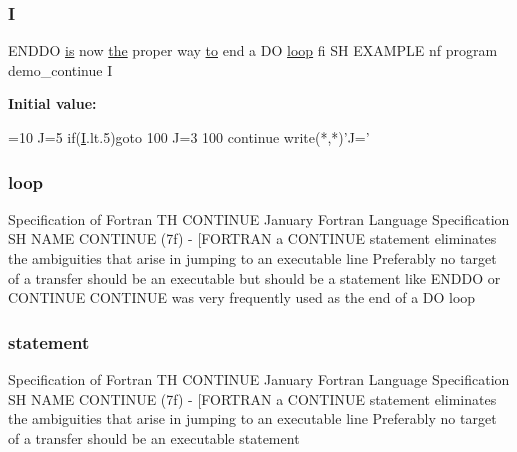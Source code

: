 \subsubsection{\texorpdfstring{I}{I}}
{\footnotesize\ttfamily E\+N\+D\+DO \hyperlink{intro__blas1_83_8txt_a42a91df93f840595de3019ceb5d1df23}{is} now \hyperlink{M__stopwatch_83_8txt_a0f266597de2e57eb3aa964927bb30e14}{the} proper way \hyperlink{M__stopwatch_83_8txt_a97209fd3e34ef701c0a9734280779cbb}{to} end a DO \hyperlink{continue_87_8txt_a5094e6a64d1227c84a0bf4db8f6c3788}{loop} fi SH E\+X\+A\+M\+P\+LE nf program demo\+\_\+continue I}

{\bfseries Initial value\+:}
\begin{DoxyCode}
=10
         J=5
         \textcolor{keywordflow}{if}(\hyperlink{continue_87_8txt_ae7b8826453d28f1bdb2fba7e889eb23b}{I}.lt.5)\textcolor{keywordflow}{goto} 100
         J=3
   100   \textcolor{keywordflow}{continue}
         write(*,*)\textcolor{stringliteral}{'J='}
\end{DoxyCode}
\mbox{\label{continue_87_8txt_a5094e6a64d1227c84a0bf4db8f6c3788}} 
\subsubsection{\texorpdfstring{loop}{loop}}
{\footnotesize\ttfamily Specification of Fortran TH C\+O\+N\+T\+I\+N\+UE January Fortran Language Specification SH N\+A\+ME C\+O\+N\+T\+I\+N\+UE (7f) -\/ \mbox{[}\+F\+O\+R\+T\+R\+A\+N a C\+O\+N\+T\+I\+N\+U\+E statement eliminates the ambiguities that arise in jumping to an executable line Preferably no target of a transfer should be an executable but should be a statement like E\+N\+D\+D\+O or C\+O\+N\+T\+I\+N\+U\+E C\+O\+N\+T\+I\+N\+U\+E was very frequently used as the end of a D\+O loop}

\mbox{\label{continue_87_8txt_ab499dad98bb4e44fe84dabd1bf0fa987}} 
\subsubsection{\texorpdfstring{statement}{statement}}
{\footnotesize\ttfamily Specification of Fortran TH C\+O\+N\+T\+I\+N\+UE January Fortran Language Specification SH N\+A\+ME C\+O\+N\+T\+I\+N\+UE (7f) -\/ \mbox{[}\+F\+O\+R\+T\+R\+A\+N a C\+O\+N\+T\+I\+N\+U\+E statement eliminates the ambiguities that arise in jumping to an executable line Preferably no target of a transfer should be an executable statement}

